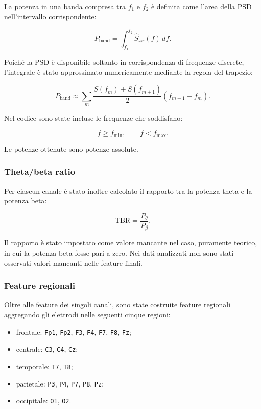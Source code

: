 La potenza in una banda compresa tra $f_1$ e $f_2$ è definita come
l'area della PSD nell'intervallo corrispondente:

\begin{equation}
	P_{\mathrm{band}}
	=
	\int_{f_1}^{f_2}
	\widehat{S}_{xx}(f)\,df.
\end{equation}

Poiché la PSD è disponibile soltanto in corrispondenza di frequenze
discrete, l'integrale è stato approssimato numericamente mediante la
regola del trapezio:

\begin{equation}
	P_{\mathrm{band}}
	\approx
	\sum_{m}
	\frac{
		S(f_m)+S(f_{m+1})
	}{2}
	\left(f_{m+1}-f_m\right).
\end{equation}

Nel codice sono state incluse le frequenze che soddisfano:

\begin{equation}
	f\geq f_{\mathrm{min}},
	\qquad
	f<f_{\mathrm{max}}.
\end{equation}

Le potenze ottenute sono potenze assolute. 


\subsubsection{Theta/beta ratio}

Per ciascun canale è stato inoltre calcolato il rapporto tra la potenza
theta e la potenza beta:

\begin{equation}
	\mathrm{TBR}
	=
	\frac{P_{\theta}}{P_{\beta}}.
\end{equation}

Il rapporto è stato impostato come valore mancante nel caso,
puramente teorico, in cui la potenza beta fosse pari a zero. Nei dati
analizzati non sono stati osservati valori mancanti nelle feature
finali.


\subsubsection{Feature regionali}

Oltre alle feature dei singoli canali, sono state costruite feature
regionali aggregando gli elettrodi nelle seguenti cinque regioni:

\begin{itemize}
	\item frontale:
	\texttt{Fp1}, \texttt{Fp2}, \texttt{F3}, \texttt{F4},
	\texttt{F7}, \texttt{F8}, \texttt{Fz};
	
	\item centrale:
	\texttt{C3}, \texttt{C4}, \texttt{Cz};
	
	\item temporale:
	\texttt{T7}, \texttt{T8};
	
	\item parietale:
	\texttt{P3}, \texttt{P4}, \texttt{P7}, \texttt{P8},
	\texttt{Pz};
	
	\item occipitale:
	\texttt{O1}, \texttt{O2}.
\end{itemize}

